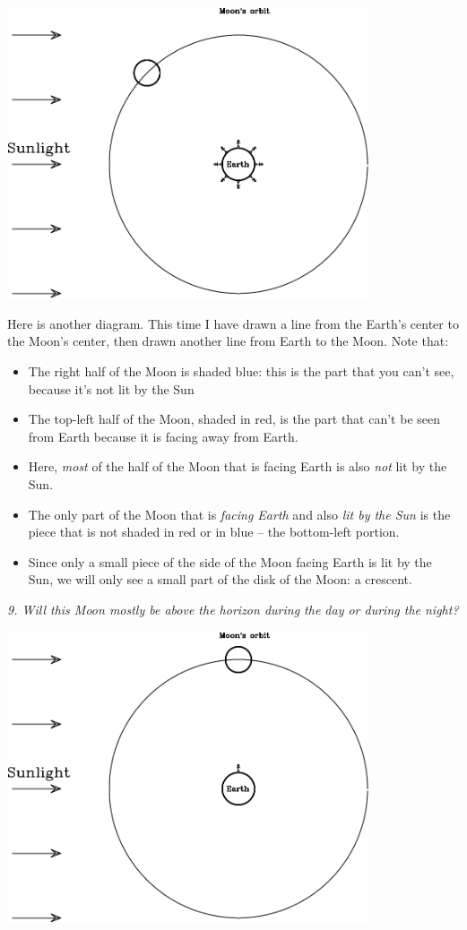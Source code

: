 \documentclass[11pt]{article}
\begin{document}
\includegraphics[width=0.8\textwidth]{moon-diagram-crescent.pdf}

Here is another diagram. This time I have drawn a line from the Earth's center to the Moon's center, then drawn another line from Earth to the Moon. Note that:

\begin{itemize}
	\item The right half of the Moon is shaded blue: this is the part that you can't see, because it's not lit by the Sun
	\item The top-left half of the Moon, shaded in red, is the part that can't be seen from Earth because it is facing away from Earth.
	\item Here, {\it most} of the half of the Moon that is facing Earth is also {\it not} lit by the Sun.
	\item The only part of the Moon that is {\it facing Earth} and also {\it lit by the Sun} is the piece that is not shaded in red or in blue -- the bottom-left portion.
	\item Since only a small piece of the side of the Moon facing Earth is lit by the Sun, we will only see a small part of the disk of the Moon: a crescent.
\end{itemize}

{\it 9. Will this Moon mostly be above the horizon during the day or during the night?}

\newpage
\includegraphics[width=0.8\textwidth]{moon-diagram-half.pdf}
\end{document}
